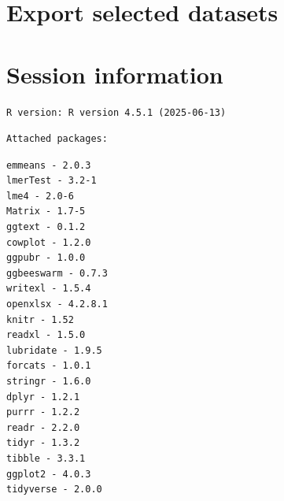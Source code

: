 \documentclass[
  10pt,
]{article}
\begin{document}
\section{Export selected datasets}\label{export-selected-datasets}

\section{\texorpdfstring{\textbf{Session
information}}{Session information}}\label{session-information}

\begin{verbatim}
R version: R version 4.5.1 (2025-06-13) 
\end{verbatim}

\begin{verbatim}
Attached packages:
\end{verbatim}

\begin{verbatim}
emmeans - 2.0.3 
lmerTest - 3.2-1 
lme4 - 2.0-6 
Matrix - 1.7-5 
ggtext - 0.1.2 
cowplot - 1.2.0 
ggpubr - 1.0.0 
ggbeeswarm - 0.7.3 
writexl - 1.5.4 
openxlsx - 4.2.8.1 
knitr - 1.52 
readxl - 1.5.0 
lubridate - 1.9.5 
forcats - 1.0.1 
stringr - 1.6.0 
dplyr - 1.2.1 
purrr - 1.2.2 
readr - 2.2.0 
tidyr - 1.3.2 
tibble - 3.3.1 
ggplot2 - 4.0.3 
tidyverse - 2.0.0 
\end{verbatim}
\end{document}

